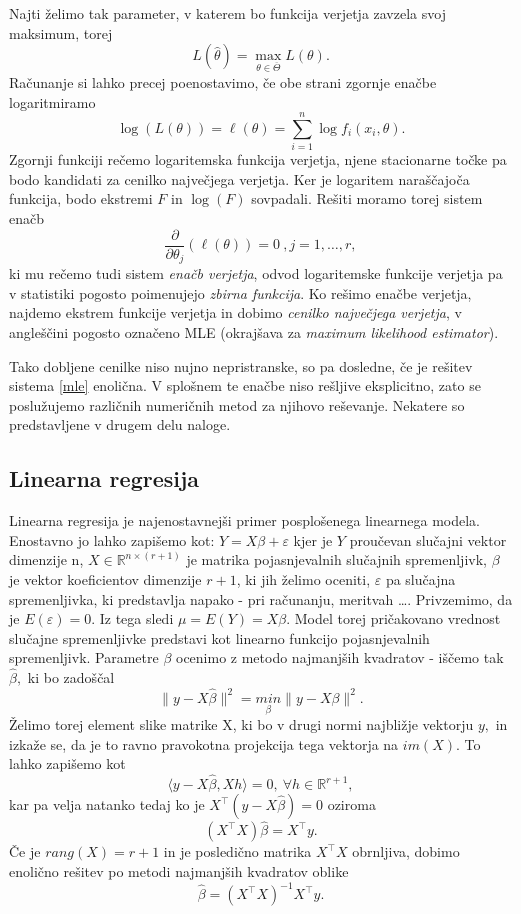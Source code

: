 \documentclass[12pt,a4paper]{amsart}
\theoremstyle{definition} %
\theoremstyle{plain} %
\begin{document}
Najti želimo tak parameter, v katerem bo funkcija verjetja zavzela svoj maksimum, torej 
\[
    L(\hat{\theta}) = \underset{\theta \in \overline{\Theta}}{\max}{L(\theta)}.
\]
Računanje si lahko precej poenostavimo, če obe strani zgornje enačbe logaritmiramo
\begin{equation}
    \log(L(\theta)) = \ell(\theta) = \sum_{i=1}^{n}\log f_{i}(x_{i},\theta).
\end{equation}
Zgornji funkciji rečemo logaritemska funkcija verjetja, njene stacionarne točke pa bodo kandidati za cenilko največjega verjetja. Ker je logaritem 
naraščajoča funkcija, bodo ekstremi $F$ in $\log (F)$ sovpadali. Rešiti moramo torej sistem enačb
\begin{equation}\label{mle}
    \frac{\partial}{\partial \theta_{j}}(\ell(\theta)) = 0~,j=1,\ldots,r,
\end{equation}
ki mu rečemo tudi sistem \textit{enačb verjetja}, odvod logaritemske funkcije verjetja pa v statistiki pogosto poimenujejo \textit{zbirna funkcija}.
Ko rešimo enačbe verjetja, najdemo ekstrem funkcije verjetja in dobimo \textit{cenilko največjega verjetja}, v angleščini pogosto označeno MLE (okrajšava za
\textit{maximum likelihood estimator}).

Tako dobljene cenilke niso nujno nepristranske, so pa dosledne, če je rešitev sistema \eqref{mle} enolična. V splošnem te enačbe niso rešljive eksplicitno, zato se poslužujemo različnih
numeričnih metod za njihovo reševanje. Nekatere so predstavljene v drugem delu naloge.

\subsection{Linearna regresija} %
Linearna regresija je najenostavnejši primer posplošenega linearnega modela. Enostavno jo lahko zapišemo kot:
$
    Y = X \beta + \varepsilon
$
kjer je $Y$ proučevan slučajni vektor dimenzije n, $X \in \mathbb{R}^{n\times (r+1)} $ je matrika pojasnjevalnih slučajnih spremenljivk, $\beta$ je vektor koeficientov dimenzije $r+1$, 
ki jih želimo oceniti, $\varepsilon$ pa slučajna spremenljivka, ki predstavlja napako - pri računanju, meritvah \ldots. Privzemimo, da je $E(\varepsilon) = 0$. Iz tega sledi
$\mu = E(Y) = X\beta$. Model torej pričakovano vrednost slučajne spremenljivke predstavi kot linearno funkcijo pojasnjevalnih spremenljivk.
Parametre $\beta$ ocenimo z metodo najmanjših kvadratov - iščemo tak $\hat{\beta}, $ ki bo zadoščal
\[
    \lVert y - X\hat{\beta} \rVert^2 = \underset{\beta}{min}\lVert y-X\beta\rVert^2.
\]
Želimo torej element slike matrike X, ki bo v drugi normi najbližje vektorju $y, $ in izkaže se, da je to ravno pravokotna projekcija tega vektorja na $im(X).$ To lahko zapišemo kot
\[
    \langle y-X\hat{\beta}, Xh \rangle = 0,~\forall h\in\mathbb{R}^{r+1},
\]
kar pa velja natanko tedaj ko je $X^\top(y-X\hat{\beta}) = 0$ oziroma
\begin{equation*}
    (X^\top X)\hat{\beta} = X^\top y.
\end{equation*}
Če je $rang(X) = r+1$ in je posledično matrika $X^\top X$ obrnljiva, dobimo enolično rešitev po metodi najmanjših kvadratov oblike 
\[
    \hat{\beta} =  (X^\top X)^{-1}X^\top y.
\]
\end{document}
